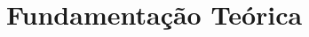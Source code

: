 \documentclass[conference,12pt]{IEEEtran}
\begin{document}


\vspace{-0.25cm}
\section{Fundamentação Teórica}
\end{document}
